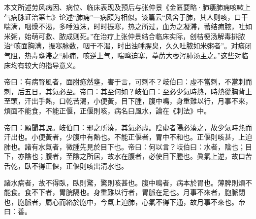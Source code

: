 \documentclass[draft,12pt]{ctexbook}
\begin{document}

本文所述劳风病因、病位、临床表现及预后与张仲景《金匮要略·肺痿肺痈咳嗽上气病脉证治第七》论述“肺痈”一病颇为相似。该篇云“风舍于肺，其人则咳，口干喘满，咽燥不渴，多唾浊沫，时时振寒，热之所过，血为之凝滞，蓄结痈脓，吐如米粥，始萌可救、脓成则死。”在治疗上张仲景结合临床实际，创桔梗汤解毒排脓治“咳面胸满，振寒脉数，咽干不渴，时出浊唾腥臭，久久吐脓如米粥者”。对痰闭气阻，热毒壅滞之“肺痈，咳逆上气，喘鸣迫塞，葶苈大枣泻肺汤主之。”这些对临床均有较大的指导意义。


\begin{yuanwen}
帝曰：有病腎風者，面胕痝然壅，害于言，可刺不？岐伯曰：虛不當刺，不當刺而刺，后五日，其氣必至。帝曰：其至何如？岐伯曰：至必少氣時熱，時熱從胸背上至頭，汗出手熱，口乾苦渴，小便黃，目下腫，腹中鳴，身重難以行，月事不來，煩面不能食，不能正偃，正偃則咳，病名曰風水，論在《刺法》中。

帝曰：願聞其說。岐伯曰：邪之所湊，其氣必虛。陰虛者陽必湊之，故少氣時熱而汗出也。小便黃者，少腹中有熱也。不能正偃者，胃中不和也。正偃則咳甚，上迫肺也。諸有水氣者，微腫先見於目下也。帝曰：何以言？岐伯曰：水者，陰也；目下，亦陰也；腹者，至陰之所居，故水在腹者，必使目下腫也。眞氣上逆，故口苦舌乾，臥不得正偃，正偃則咳出清水也。

諸水病者，故不得臥，臥則驚，驚則咳甚也。腹中鳴者，病本於胃也。薄脾則煩不能食。食不下者，胃脘隔也。身重難以行者，胃脈在足也。月事不來者，胞脈閉也，胞脈者，屬心而絡於胞中，今氣上迫肺，心氣不得下通，故月事不來也。帝曰：善。
\end{yuanwen}

\end{document}
